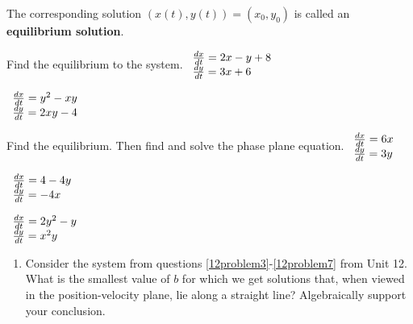 \bigskip

The corresponding solution $(x(t),y(t)) = (x_0,y_0)$ is called an \textbf{equilibrium solution}.



\begin{enumerate}[resume]
\ii Find the equilibrium to the system.
\bb
\ii $\displaystyle \begin{array}{l}
\frac{dx}{dt} =2x-y+8 \\
\frac{dy}{dt} =3x+6
\end{array}$
\vfill

\ii $\displaystyle \begin{array}{l}
\frac{dx}{dt} =y^2-xy \\
\frac{dy}{dt} =2xy-4
\end{array}$
\ee

\vfill

\pagebreak

\ii Find the equilibrium. Then find and solve the phase plane equation.
\bb
\ii $\displaystyle \begin{array}{l}
\frac{dx}{dt} =6x \\
\frac{dy}{dt} =3y
\end{array}$

\vfill

\ii $\displaystyle \begin{array}{l}
\frac{dx}{dt} =4-4y \\
\frac{dy}{dt} =-4x
\end{array}$


\vfill

\clearpage

\ii $\displaystyle \begin{array}{l}
\frac{dx}{dt} =2y^2-y \\
\frac{dy}{dt} =x^2y
\end{array}$

\vfill

\ee
\ee

\clearpage


\begin{enumerate}
\item Consider the system from questions \ref{12problem3}-\ref{12problem7} from Unit 12. What is the smallest value of $b$ for which we get solutions that, when viewed in the position-velocity plane, lie along a straight line? Algebraically support your conclusion. \label{12HWproblem1}


\end{enumerate}
\end{enumerate}
